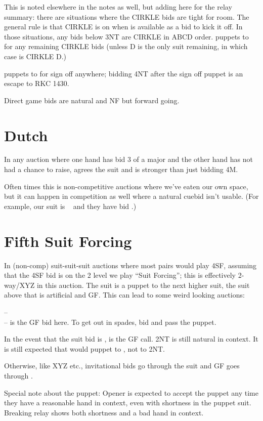 \documentclass[tom-ari]{subfile}
\begin{document}
This is noted elsewhere in the notes as well, but adding here for the relay summary: there are situations where the CIRKLE bids are tight for room.  The general rule is that CIRKLE is on when  is available as a bid to kick it off.  In those situations, any bids below 3NT are CIRKLE in ABCD order.  puppets to  for any remaining CIRKLE bids (unless D is the only suit remaining, in which case  is CIRKLE D.) 

 puppets to  for sign off anywhere; bidding 4NT after the sign off puppet is an escape to RKC 1430. 

Direct game bids are natural and NF but forward going.

\section[Dutch 4C]{Dutch }
\label{dutch4C}
In any auction where one hand has bid 3 of a major and the other hand has not had a chance to raise,  agrees the suit and is stronger than just bidding 4M.

Often times this is non-competitive auctions where we've eaten our own space, but it can happen in competition as well where a natural cuebid isn't usable.  (For example, our suit is \hhh~ and they have bid .)

\section{Fifth Suit Forcing}
\label{5sf}

In (non-comp) suit-suit-suit auctions where most pairs would play 4SF, assuming that the 4SF bid is on the 2 level we play ``\fifth Suit Forcing''; this is effectively 2-way/XYZ in this auction.  The \fourth suit is a puppet to the next higher suit, the suit above that is artificial and GF.  This can lead to some weird looking auctions:

--\\
-- is the GF bid here.  To get out in spades, bid  and pass the puppet.

In the event that the \fourth suit bid is ,  is the GF call.  2NT is still natural in context. It is still expected that  would puppet to , not to 2NT. 

Otherwise, like XYZ etc., invitational bids go through the \fourth suit and GF goes through \fifth.

Special note about the puppet:  Opener is expected to accept the puppet any time they have a reasonable hand in context, even with shortness in the puppet suit.  Breaking relay shows both shortness and a bad hand in context.
\end{document}
